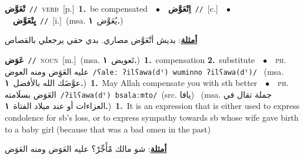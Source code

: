 \documentclass[10pt,a4paper,twoside]{article} %
\begin{document}
\begin{multicols}{2}
{\setlength\topsep{0pt}\textbf{\foreignlanguage{arabic}{تْعَوَّض}}\ {\color{gray}\texttt{//}\color{black}}\ \textsc{verb}\ [p.]\ \textbf{1.}~be compensated\ \ $\bullet$\ \ \setlength\topsep{0pt}\textbf{\foreignlanguage{arabic}{اِتْعَوَّض}}\ {\color{gray}\texttt{//}\color{black}}\ [c.]\ \ $\bullet$\ \ \setlength\topsep{0pt}\textbf{\foreignlanguage{arabic}{يِتْعَوَّض}}\ {\color{gray}\texttt{//}\color{black}}\ [i.]\ \color{gray}(msa. \foreignlanguage{arabic}{يُعَوَّض}~\foreignlanguage{arabic}{\textbf{١.}})\color{black}\  \begin{flushright}\color{gray}\foreignlanguage{arabic}{\textbf{\underline{\foreignlanguage{arabic}{أمثلة}}}: بديش أتْعَوَّض مصاري. بدي حقي يرجعلي بالقصاص}\end{flushright}\color{black}} \vspace{2mm}

{\setlength\topsep{0pt}\textbf{\foreignlanguage{arabic}{عَوَض}}\ {\color{gray}\texttt{//}\color{black}}\ \textsc{noun}\ [m.]\ \color{gray}(msa. \foreignlanguage{arabic}{تَعويض}~\foreignlanguage{arabic}{\textbf{١.}})\color{black}\ \textbf{1.}~compensation  \textbf{2.}~substitute\ \ $\bullet$\ \ \textsc{ph.} \color{gray} \foreignlanguage{arabic}{عليه العَوَِض ومنه العوض}\color{black}\ {\color{gray}\texttt{/{\sffamily ʕaleː ʔilʕawa(dˤ) wuminno ʔilʕawa(dˤ)}/}\color{black}}\ \color{gray} (msa. \foreignlanguage{arabic}{عوَّضَك الله بالأفضل}~\foreignlanguage{arabic}{\textbf{١.}})\color{black}\ \textbf{1.}~May Allah compensate you with sth better\ \ $\bullet$\ \ \textsc{ph.} \color{gray} \foreignlanguage{arabic}{العَوَض بسلَامته}\color{black}\ {\color{gray}\texttt{/{\sffamily ʔilʕawa(dˤ) bsalaːmto}/}\color{black}}\ \color{gray}(src. \foreignlanguage{arabic}{يافا})\color{black}\ \color{gray} (msa. \foreignlanguage{arabic}{جملة تقال في العزاءات أو عند ميلاد الفتاة}~\foreignlanguage{arabic}{\textbf{١.}})\color{black}\ \textbf{1.}~It is an expression that is either used to express condolence for sb's loss, or to express sympathy towards sb whose wife gave birth to a baby girl (because that was a bad omen in the past)\  \begin{flushright}\color{gray}\foreignlanguage{arabic}{\textbf{\underline{\foreignlanguage{arabic}{أمثلة}}}: شو مالك مْأَجِّرْ؟ عليه العَوَض ومنه العَوَض}\end{flushright}\color{black}} \vspace{2mm}


\end{multicols}
\end{document}
